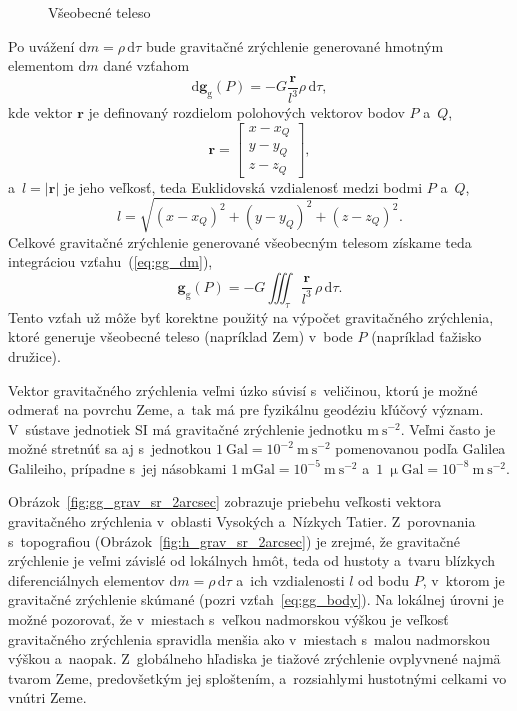 \documentclass[a4paper, 12pt]{book}
\newcommand{\diff}{\mathrm d}
\newcommand{\gidx}{\mathrm g}
\let\vec\mathbf
\begin{document}
\begin{figure}
\centering

\caption{Všeobecné teleso}
\label{fig:gravitating_body}
\end{figure}

Po uvážení $\diff m = \rho \, \diff \tau$ bude gravitačné zrýchlenie generované
hmotným elementom $\diff m$ dané vzťahom
%
\begin{equation}
\label{eq:gg_dm}
\diff \vec g_\gidx(P) = -G \frac{\vec r}{l^3} \rho \, \diff\tau{,}
\end{equation}
%
kde vektor $\vec r$ je definovaný rozdielom polohových vektorov bodov $P$
a~$Q$,
%
\begin{equation}
\label{eq:r}
\vec r =
%
\begin{bmatrix}
x - x_Q \\
y - y_Q \\
z - z_Q
\end{bmatrix}
{,}
\end{equation}
%
a~$l = | \vec r |$ je jeho veľkosť, teda Euklidovská vzdialenosť medzi bodmi
$P$ a~$Q$,
%
\begin{equation}
\label{eq:l}
l = \sqrt{(x - x_Q)^2 + (y - y_Q)^2 + (z - z_Q)^2}{.}
\end{equation}
%
Celkové gravitačné zrýchlenie generované všeobecným telesom získame teda
integráciou vzťahu~(\ref{eq:gg_dm}),
%
\begin{equation}
\label{eq:gg_body}
\vec g_\gidx(P) = -G \iiint_{\tau} \frac{\vec r}{l^3} \, \rho \, \diff\tau{.}
\end{equation}
%
Tento vzťah už môže byť korektne použitý na výpočet gravitačného zrýchlenia,
ktoré generuje všeobecné teleso (napríklad Zem) v~bode $P$ (napríklad ťažisko
družice).

Vektor gravitačného zrýchlenia veľmi úzko súvisí s~veličinou, ktorú je možné
odmerať na povrchu Zeme, a~tak má pre fyzikálnu geodéziu kľúčový význam.
V~sústave jednotiek SI má gravitačné zrýchlenie jednotku $\mathrm{m}\
\mathrm{s}^{-2}$.  Veľmi často je možné stretnúť sa aj s~jednotkou $1\
\mathrm{Gal} = 10^{-2}\ \mathrm{m}\ \mathrm{s}^{-2}$ pomenovanou podľa Galilea
Galileiho, prípadne s~jej násobkami $1\ \mathrm{mGal} = 10^{-5}\ \mathrm{m}\
\mathrm{s}^{-2}$ a~$1\ \upmu \mathrm{Gal} = 10^{-8}\ \mathrm{m}\
\mathrm{s}^{-2}$.

Obrázok~\ref{fig:gg_grav_sr_2arcsec} zobrazuje priebehu veľkosti vektora
gravitačného zrýchlenia v~oblasti Vysokých a~Nízkych Tatier.  Z~porovnania
s~topografiou (Obrázok~\ref{fig:h_grav_sr_2arcsec}) je zrejmé, že gravitačné
zrýchlenie je veľmi závislé od lokálnych hmôt, teda od hustoty a~tvaru blízkych
diferenciálnych elementov $\diff m = \rho \, \diff \tau$ a~ich vzdialenosti $l$
od bodu $P$, v~ktorom je gravitačné zrýchlenie skúmané (pozri
vzťah~\ref{eq:gg_body}).  Na lokálnej úrovni je možné pozorovať, že v~miestach
s~veľkou nadmorskou výškou je veľkosť gravitačného zrýchlenia spravidla menšia
ako v~miestach s~malou nadmorskou výškou a~naopak.  Z~globálneho hľadiska je
tiažové zrýchlenie ovplyvnené najmä tvarom Zeme, predovšetkým jej sploštením,
a~rozsiahlymi hustotnými celkami vo vnútri Zeme.
\end{document}
